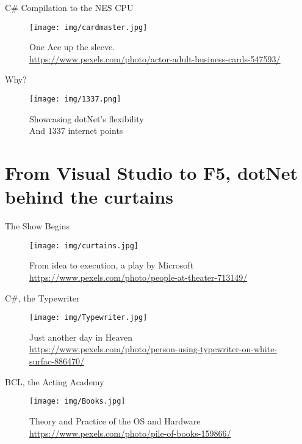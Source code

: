 \documentclass[10pt]{beamer}
\begin{document}
\begin{frame}{C\# Compilation to the NES CPU}
    \begin{figure}
        \centering
        \texttt{[image: img/cardmaster.jpg]}
        \caption{One Ace up the sleeve. \\ \tiny{\href{Photo by Nikolai Ivanov from Pexels}{https://www.pexels.com/photo/actor-adult-business-cards-547593/}}}
    \end{figure}
\end{frame}

\begin{frame}{Why?}
    \begin{figure}
        \centering
        \texttt{[image: img/1337.png]}
        \caption{Showcasing dotNet's flexibility \\ \tiny{And 1337 internet points}}
    \end{figure}
\end{frame}

\section{From Visual Studio to F5, dotNet behind the curtains}
\begin{frame}{The Show Begins}
    \begin{figure}
        \centering
        \texttt{[image: img/curtains.jpg]}
        \caption{From idea to execution, a play by Microsoft \\ \tiny{\href{Photo by Monica Silvestre from Pexels}{https://www.pexels.com/photo/people-at-theater-713149/}}}
    \end{figure}
\end{frame}

\begin{frame}{C\#, the Typewriter}
    \begin{figure}
        \centering
        \texttt{[image: img/Typewriter.jpg]}
        \caption{Just another day in Heaven \\ \tiny{\href{Photo by rawpixel.com from Pexels}{https://www.pexels.com/photo/person-using-typewriter-on-white-surfac-886470/}}}
    \end{figure}
\end{frame}

\begin{frame}{BCL, the Acting Academy}
    \begin{figure}
        \centering
        \texttt{[image: img/Books.jpg]}
        \caption{Theory and Practice of the OS and Hardware \\ \tiny{\href{Photo by Pixabay from Pexels}{https://www.pexels.com/photo/pile-of-books-159866/}}}
    \end{figure}
\end{frame}
\end{document}
